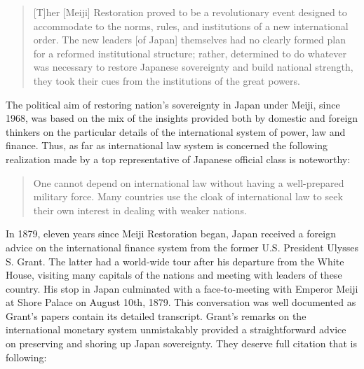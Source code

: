 \begin{quote}
[T]her [Meiji] Restoration proved to be a revolutionary event designed to accommodate to the norms, rules, and institutions of a new international order. The new leaders [of Japan] themselves had no clearly formed plan for a reformed institutional structure; rather, determined to do whatever was necessary to restore Japanese sovereignty and build national strength, they took their cues from the institutions of the great powers. \citep[p.~68]{pyle2008}
\end{quote}

The political aim of restoring nation's sovereignty in Japan under Meiji, since 1968, was based on the mix of the insights provided both by domestic and foreign thinkers on the particular details of the international system of power, law and finance. Thus, as far as international law system is concerned the following realization made by a top representative of Japanese official class is noteworthy:

\begin{quote}
One cannot depend on international law without having a well-prepared military force. Many countries use the cloak of international law to seek their own interest in dealing with weaker nations. \citep[p.~61]{schiltz2012}
\end{quote}

In 1879, eleven years since Meiji Restoration began, Japan received a foreign advice on the international finance system from the former U.S. President Ulysses S. Grant. The latter had a world-wide tour after his departure from the White House, visiting many capitals of the nations and meeting with leaders of these country. His stop in Japan culminated with a face-to-meeting with Emperor Meiji at Shore Palace on August 10th, 1879. This conversation was well documented as Grant's papers contain its detailed transcript. Grant's remarks on the international monetary system unmistakably provided a straightforward advice on preserving and shoring up Japan sovereignty. They deserve full citation that is following:

